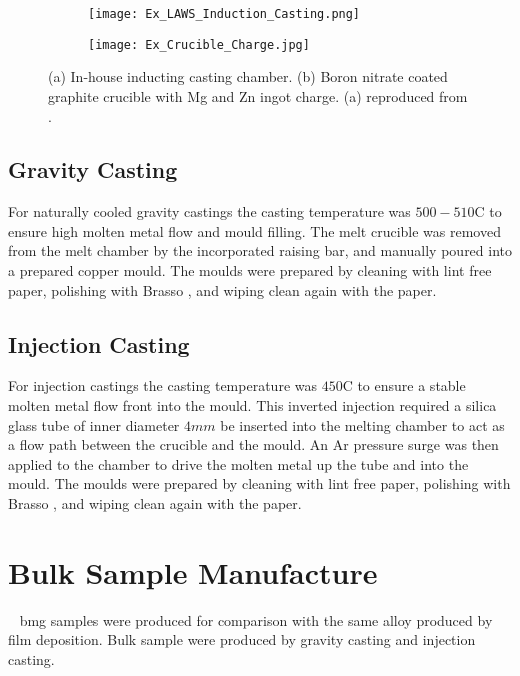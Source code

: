 \begin{figure}[htbp]
	\centering
	\begin{subfigure}[htbp]{0.49\textwidth}
		\texttt{[image: Ex\_LAWS\_Induction\_Casting.png]}
		\caption{}
		\label{fig:LawsCasting}
	\end{subfigure}
	\begin{subfigure}[htbp]{0.375\textwidth}
		\texttt{[image: Ex\_Crucible\_Charge.jpg]}
		\caption{}
		\label{fig:CrucibleCharge}
	\end{subfigure}
	\caption[(a) In-house inducting casting chamber. (b) Boron nitrate coated graphite crucible with Mg and Zn ingot charge.]{(a) In-house inducting casting chamber. (b) Boron nitrate coated graphite crucible with Mg and Zn ingot charge. (a) reproduced from \cite{Laws2007}.}%
	\label{fig:Induction}
\end{figure}

\subsection{Gravity Casting} \label{sec:MasterGravityCasting}

For naturally cooled gravity castings the casting temperature was $500- 510$\degree C to ensure high molten metal flow and mould filling. The melt crucible was removed from the melt chamber by the incorporated raising bar, and manually poured into a prepared copper mould. The moulds were prepared by cleaning with lint free paper, polishing with Brasso \textcopyright, and wiping clean again with the paper. 

\subsection{Injection Casting} \label{sec:MasterInjectionCasting}

For injection castings the casting temperature was $450$\degree C to ensure a stable molten metal flow front into the mould. This inverted injection required a silica glass tube of inner diameter $4mm$ be inserted into the melting chamber to act as a flow path between the crucible and the mould. An Ar pressure surge was then applied to the chamber to drive the molten metal up the tube and into the mould. The moulds were prepared by cleaning with lint free paper, polishing with Brasso \textcopyright, and wiping clean again with the paper. 

\section{Bulk Sample Manufacture}
\MgZnCa~ \gls{bmg} samples were produced for comparison with the same alloy produced by film deposition. Bulk sample were produced by gravity casting and injection casting. 


